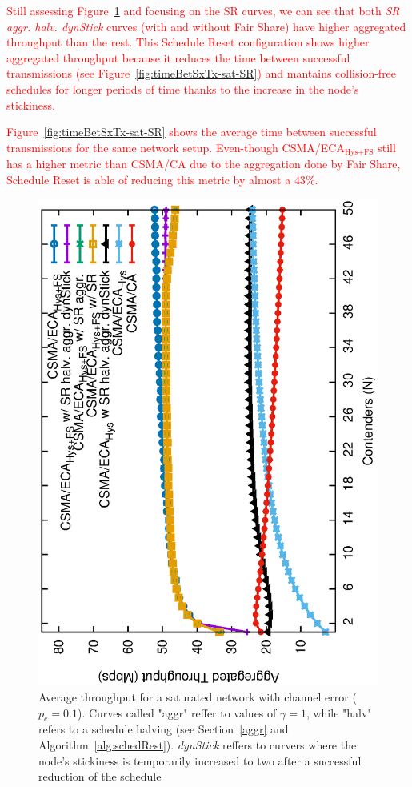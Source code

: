 	\textcolor{red}{Still assessing Figure~\ref{fig:throughput-sat-SR} and focusing on the SR curves, we can see that both \emph{SR aggr. halv. dynStick} curves (with and without Fair Share) have higher aggregated throughput than the rest. This Schedule Reset configuration shows higher aggregated throughput because it reduces the time between successful transmissions (see Figure~\ref{fig:timeBetSxTx-sat-SR}) and mantains collision-free schedules for longer periods of time thanks to the increase in the node's stickiness.}
	
	\textcolor{red}{Figure~\ref{fig:timeBetSxTx-sat-SR} shows the average time between successful transmissions for the same network setup. Even-though CSMA/ECA$_{\text{Hys+FS}}$ still has a higher metric than CSMA/CA due to the aggregation done by Fair Share, Schedule Reset is able of reducing this metric by almost a $43\%$.}
	
	\begin{figure}[tb]
		\centering
		\includegraphics[width=0.7\linewidth,angle=-90]{figures/tonFigs/throughput-sat-SR-TON.eps}
		\caption{Average throughput for a saturated network with channel error ($p_e=0.1$). Curves called "aggr" reffer to values of $\gamma=1$, while "halv" refers to a schedule halving (see Section~\ref{aggr} and Algorithm~\ref{alg:schedRest}). \emph{dynStick} reffers to curvers where the node's stickiness is temporarily increased to two after a successful reduction of the schedule}
		\label{fig:throughput-sat-SR}
	\end{figure}
	
